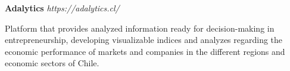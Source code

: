 \item
\headerrow
{\textbf{Adalytics}}
{\emph{https://adalytics.cl/}}
\begin{itemize*}
    \item Platform that provides analyzed information ready for decision-making in 
    entrepreneurship, developing visualizable indices and analyzes regarding 
    the economic performance of markets and companies in the different regions 
    and economic sectors of Chile.
\end{itemize*}